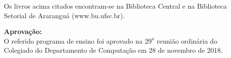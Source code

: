Os livros acima citados encontram-se na Biblioteca Central e na Biblioteca Setorial de Ararangu\'a (www.bu.ufsc.br).

\vskip1cm

{\bf Aprovação: }\\

O referido programa de ensino foi aprovado na $29^a$ reuni\~ao ordin\'aria do Colegiado do Departamento de Computa\c c\~ao em 28 de novembro de 2018.
